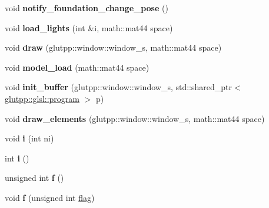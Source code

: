 \begin{DoxyCompactItemize}
\item 
\hypertarget{classglutpp_1_1shape_1_1shape_ab30cd62c6b82b7554c75c888128af643}{void {\bfseries notify\-\_\-foundation\-\_\-change\-\_\-pose} ()}\label{classglutpp_1_1shape_1_1shape_ab30cd62c6b82b7554c75c888128af643}

\item 
\hypertarget{classglutpp_1_1shape_1_1shape_a1ddc31299c0c30035cf3da2b459f0e33}{void {\bfseries load\-\_\-lights} (int \&i, math\-::mat44 space)}\label{classglutpp_1_1shape_1_1shape_a1ddc31299c0c30035cf3da2b459f0e33}

\item 
\hypertarget{classglutpp_1_1shape_1_1shape_a1405b5fa5bd7ef35b95fe42398473dd6}{void {\bfseries draw} (glutpp\-::window\-::window\-\_\-s, math\-::mat44 space)}\label{classglutpp_1_1shape_1_1shape_a1405b5fa5bd7ef35b95fe42398473dd6}

\item 
\hypertarget{classglutpp_1_1shape_1_1shape_ac92f92deca5aa0221155bbb236c580e2}{void {\bfseries model\-\_\-load} (math\-::mat44 space)}\label{classglutpp_1_1shape_1_1shape_ac92f92deca5aa0221155bbb236c580e2}

\item 
\hypertarget{classglutpp_1_1shape_1_1shape_a892f5bc48dc85c0e563d3a2d36d0a6a7}{void {\bfseries init\-\_\-buffer} (glutpp\-::window\-::window\-\_\-s, std\-::shared\-\_\-ptr$<$ \hyperlink{classglutpp_1_1glsl_1_1program}{glutpp\-::glsl\-::program} $>$ p)}\label{classglutpp_1_1shape_1_1shape_a892f5bc48dc85c0e563d3a2d36d0a6a7}

\item 
\hypertarget{classglutpp_1_1shape_1_1shape_aae227812031a08674adac60d98135f27}{void {\bfseries draw\-\_\-elements} (glutpp\-::window\-::window\-\_\-s, math\-::mat44 space)}\label{classglutpp_1_1shape_1_1shape_aae227812031a08674adac60d98135f27}

\item 
\hypertarget{classglutpp_1_1shape_1_1shape_a691317aef9c651b798d5a9665a870951}{void {\bfseries i} (int ni)}\label{classglutpp_1_1shape_1_1shape_a691317aef9c651b798d5a9665a870951}

\item 
\hypertarget{classglutpp_1_1shape_1_1shape_a517cac7ef31a24c2d01161d4db27efbb}{int {\bfseries i} ()}\label{classglutpp_1_1shape_1_1shape_a517cac7ef31a24c2d01161d4db27efbb}

\item 
\hypertarget{classglutpp_1_1shape_1_1shape_a5186c28b74f4e8d141edf5b4895d54fc}{unsigned int {\bfseries f} ()}\label{classglutpp_1_1shape_1_1shape_a5186c28b74f4e8d141edf5b4895d54fc}

\item 
\hypertarget{classglutpp_1_1shape_1_1shape_af5528e1ff5838dcff3fa1e8cb5a47c49}{void {\bfseries f} (unsigned int \hyperlink{structglutpp_1_1shape_1_1flag}{flag})}\label{classglutpp_1_1shape_1_1shape_af5528e1ff5838dcff3fa1e8cb5a47c49}

\end{DoxyCompactItemize}

